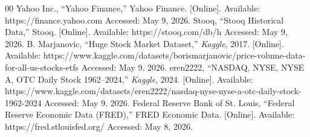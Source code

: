 \documentclass[conference]{IEEEtran}
\begin{document}
\begin{thebibliography}{00}
    Yahoo Inc., ``Yahoo Finance,'' Yahoo Finance. [Online].
    Available: https://finance.yahoo.com
    Accessed: May 9, 2026.
    Stooq, ``Stooq Historical Data,'' Stooq. [Online].
    Available: https://stooq.com/db/h
    Accessed: May 9, 2026.
    B. Marjanovic, ``Huge Stock Market Dataset,'' \textit{Kaggle},
    2017. [Online]. Available:
    https://www.kaggle.com/datasets/borismarjanovic/price-volume-data-for-all-us-stocks-etfs
    Accessed: May 9, 2026.
    eren2222, ``NASDAQ, NYSE, NYSE A, OTC Daily Stock 1962--2024,''
    \textit{Kaggle}, 2024. [Online]. Available:
    https://www.kaggle.com/datasets/eren2222/nasdaq-nyse-nyse-a-otc-daily-stock-1962-2024
    Accessed: May 9, 2026.
    Federal Reserve Bank of St. Louis, ``Federal Reserve Economic Data (FRED),''
    FRED Economic Data. [Online]. Available: https://fred.stlouisfed.org/
    Accessed: May 8, 2026.

\end{thebibliography}
\end{document}
